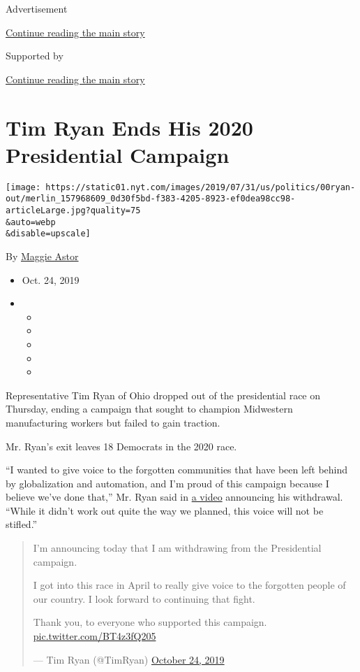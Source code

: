 Advertisement

\protect\hyperlink{after-top}{Continue reading the main story}

Supported by

\protect\hyperlink{after-sponsor}{Continue reading the main story}

\hypertarget{tim-ryan-ends-his-2020-presidential-campaign}{%
\section{Tim Ryan Ends His 2020 Presidential
Campaign}\label{tim-ryan-ends-his-2020-presidential-campaign}}

\texttt{[image: https://static01.nyt.com/images/2019/07/31/us/politics/00ryan-out/merlin\_157968609\_0d30f5bd-f383-4205-8923-ef0dea98cc98-articleLarge.jpg?quality=75\\\&auto=webp\\\&disable=upscale]}

By \href{https://www.nytimes.com/by/maggie-astor}{Maggie Astor}

\begin{itemize}
\item
  Oct. 24, 2019
\item
  \begin{itemize}
  \item
  \item
  \item
  \item
  \item
  \end{itemize}
\end{itemize}

Representative Tim Ryan of Ohio dropped out of the presidential race on
Thursday, ending a campaign that sought to champion Midwestern
manufacturing workers but failed to gain traction.

Mr. Ryan's exit leaves 18 Democrats in the 2020 race.

``I wanted to give voice to the forgotten communities that have been
left behind by globalization and automation, and I'm proud of this
campaign because I believe we've done that,'' Mr. Ryan said in
\href{https://twitter.com/TimRyan/status/1187405891856785410}{a video}
announcing his withdrawal. ``While it didn't work out quite the way we
planned, this voice will not be stifled.''

\begin{quote}
I'm announcing today that I am withdrawing from the Presidential
campaign.

I got into this race in April to really give voice to the forgotten
people of our country. I look forward to continuing that fight.

Thank you, to everyone who supported this campaign.
\href{https://t.co/BT4z3fQ205}{pic.twitter.com/BT4z3fQ205}

--- Tim Ryan (@TimRyan)
\href{https://twitter.com/TimRyan/status/1187405891856785410?ref_src=twsrc\%5Etfw}{October
24, 2019}
\end{quote}

